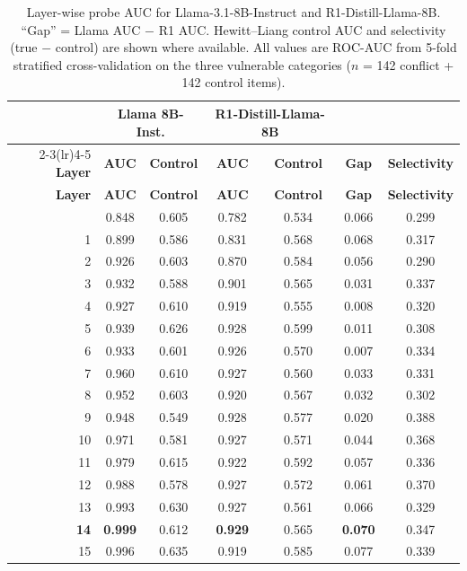 \documentclass[accepted]{article}
\begin{document}
\begin{longtable}{rcccccc}
\caption{Layer-wise probe AUC for Llama-3.1-8B-Instruct and
  R1-Distill-Llama-8B.  ``Gap'' = Llama AUC $-$ R1 AUC.
  Hewitt--Liang control AUC and selectivity (true $-$ control) are
  shown where available.  All values are ROC-AUC from 5-fold
  stratified cross-validation on the three vulnerable categories
  ($n$ = 142 conflict + 142 control items).}
\label{tab:probe_all_layers} \\
\toprule
& \multicolumn{2}{c}{\textbf{Llama 8B-Inst.}} & \multicolumn{2}{c}{\textbf{R1-Distill-Llama-8B}} & & \\
\cmidrule(lr){2-3}\cmidrule(lr){4-5}
\textbf{Layer} & \textbf{AUC} & \textbf{Control} & \textbf{AUC} & \textbf{Control} & \textbf{Gap} & \textbf{Selectivity} \\
\midrule
\endfirsthead
\toprule
\textbf{Layer} & \textbf{AUC} & \textbf{Control} & \textbf{AUC} & \textbf{Control} & \textbf{Gap} & \textbf{Selectivity} \\
\midrule
\endhead
\bottomrule
\endfoot
 0 & 0.848 & 0.605 & 0.782 & 0.534 & 0.066 & 0.299 \\
 1 & 0.899 & 0.586 & 0.831 & 0.568 & 0.068 & 0.317 \\
 2 & 0.926 & 0.603 & 0.870 & 0.584 & 0.056 & 0.290 \\
 3 & 0.932 & 0.588 & 0.901 & 0.565 & 0.031 & 0.337 \\
 4 & 0.927 & 0.610 & 0.919 & 0.555 & 0.008 & 0.320 \\
 5 & 0.939 & 0.626 & 0.928 & 0.599 & 0.011 & 0.308 \\
 6 & 0.933 & 0.601 & 0.926 & 0.570 & 0.007 & 0.334 \\
 7 & 0.960 & 0.610 & 0.927 & 0.560 & 0.033 & 0.331 \\
 8 & 0.952 & 0.603 & 0.920 & 0.567 & 0.032 & 0.302 \\
 9 & 0.948 & 0.549 & 0.928 & 0.577 & 0.020 & 0.388 \\
10 & 0.971 & 0.581 & 0.927 & 0.571 & 0.044 & 0.368 \\
11 & 0.979 & 0.615 & 0.922 & 0.592 & 0.057 & 0.336 \\
12 & 0.988 & 0.578 & 0.927 & 0.572 & 0.061 & 0.370 \\
13 & 0.993 & 0.630 & 0.927 & 0.561 & 0.066 & 0.329 \\
\textbf{14} & \textbf{0.999} & 0.612 & \textbf{0.929} & 0.565 & \textbf{0.070} & 0.347 \\
15 & 0.996 & 0.635 & 0.919 & 0.585 & 0.077 & 0.339 \\

\end{longtable}
\end{document}
